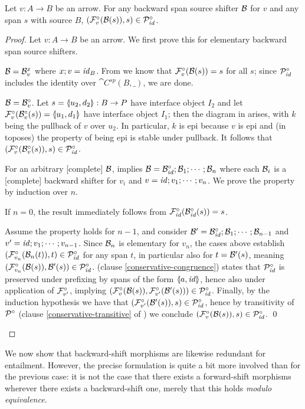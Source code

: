 \begin{lemma}
Let $v:A\to B$ be an arrow. For any backward span source shifter $\cB$ for $v$ and any span $s$ with source $B$, $(\dF v(\cB(s)),s)\in \ccP_\id$.
\end{lemma}
%
\begin{proof}
Let $v:A\to B$ be an arrow. We first prove this for elementary backward span source shifters.
\begin{itemizeS}
\item $\cB=\rB v x$ where $x;v=\id_B$. From  we know that $\dF v(\cB(s))=s$ for all $s$; since $\ccP_\id$ includes the identity over $\cat{C^{sp}}(B,\_)$, we are done.

\item $\cB=\dB v$. Let $s=\spanof{u_2}{d_2}:B\to P$ have interface object $I_2$ and let $\dF v(\dB v(s))=\spanof{u_1}{d_1}$ have interface object $I_1$; then the diagram in  arises, with $k$ being the pullback of $v$ over $u_2$. In particular, $k$ is epi because $v$ is epi and (in toposes) the property of being epi is stable under pullback. It follows that $(\dF v(\dB v(s)),s)\in \ccP_\id$.
\end{itemizeS}
%
For an arbitrary [complete] $\cB$,  implies $\cB=\dB\id;\cB_1;\cdots;\cB_n$ where each $\cB_i$ is a [complete] backward shifter for $v_i$ and $v=\id;v_1;\cdots;v_n$. We prove the property by induction over $n$.
\begin{itemizeS}
\item If $n=0$, the result immediately follows from $\dF\id(\dB\id(s))=s$.
\item Assume the property holds for $n-1$, and consider $\cB'=\dB\id; \cB_1;\cdots;\cB_{n-1}$ and $v'=\id;v_1;\cdots;v_{n-1}$. Since $\cB_n$ is elementary for $v_n$, the cases above establish $(\dF{v_n}(\cB_n(t)),t)\in \ccP_\id$ for any span $t$, in particular also for $t=\cB'(s)$, meaning $(\dF{v_n}(\cB(s)),\cB'(s))\in \ccP_\id$.  (clause \ref{conservative-congruence}) states that $\ccP_\id$ is preserved under prefixing by spans of the form $\spanof a \id$, hence also under application of $\dF{v'}$, implying $(\dF{v}(\cB(s)),\dF{v'}(\cB'(s)))\in \ccP_\id$. Finally, by the induction hypothesis we have that $(\dF{v'}(\cB'(s)),s)\in \ccP_\id$, hence by transitivity of $\ccP$ (clause \ref{conservative-transitive} of ) we conclude $(\dF{v}(\cB(s)),s)\in \ccP_\id$.
\qed
\end{itemizeS}
\end{proof}
%
We now show that backward-shift morphisms are likewise redundant for {\fprovable} entailment. However, the precise formulation is quite a bit more involved than for the previous case: it is not the case that there exists a forward-shift morphisms wherever there exists a backward-shift one, merely that this holds \emph{modulo {\fprovable} equivalence}.

